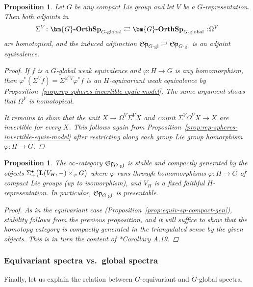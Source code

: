 \documentclass[reqno]{memo-l}
\theoremstyle{mythm}
\newtheorem{prop}[thm]{Proposition}
\theoremstyle{definition}
\numberwithin{equation}{section}
\renewcommand{\phi}{\varphi}
\newcommand{\cat}[1]{\textbf{\textup{#1}}}
\newcommand\noloc{%
	\nobreak
	\mspace{6mu plus 1mu}
	{:}
	\nonscript\mkern-\thinmuskip
	\mathpunct{}
	\mspace{2mu}
}
\newcommand{\mySp}{{\mathfrak S\kern-.5pt\mathfrak p}}
\newcommand{\Gosp}[1]{\cat{$\bm{#1}$-OrthSp}}
\begin{document}
\begin{prop}\label{prop:resp-stability-G-gl}
    Let $G$ be any compact Lie group and let $V$ be a $G$-representation. Then both adjoints in
    \[
        \Sigma^V\colon\Gosp{G}_\textup{$G$-global}\rightleftarrows\Gosp{G}_\textup{$G$-global}\noloc\Omega^V
    \]
    are homotopical, and the induced adjunction $\mySp_\textup{$G$-gl}\rightleftarrows\mySp_\textup{$G$-gl}$ is an adjoint equivalence.
    \begin{proof}
        If $f$ is a $G$-global weak equivalence and $\phi\colon H\to G$ is any homomorphism, then $\phi^*(\Sigma^Vf)=\Sigma^{\phi^*V}\phi^*f$ is an $H$-equivariant weak equivalence by Proposition~\ref{prop:rep-spheres-invertible-equiv-model}. The same argument shows that $\Omega^V$ is homotopical.

        It remains to show that the unit $X\to\Omega^V\Sigma^VX$ and counit $\Sigma^V\Omega^VX\to X$ are invertible for every $X$. This follows again from Proposition~\ref{prop:rep-spheres-invertible-equiv-model} after restricting along each group Lie group homorphism $\phi\colon H\to G$.
    \end{proof}
\end{prop}

\begin{prop}\label{prop:gl-spectra-compact-generators}
    The $\infty$-category $\mySp_\textup{$G$-gl}$ is stable and compactly generated by the objects $\Sigma^\bullet_+\big(\cat{L}(V_H,-)\times_\phi G\big)$ where $\phi$ runs through homomorphisms $\phi\colon H\to G$ of compact Lie groups (up to isomorphism), and $V_H$ is a fixed faithful $H$-representation. In particular, $\mySp_\textup{$G$-gl}$ is presentable.
    \begin{proof}
        As in the equivariant case (Proposition~\ref{prop:equiv-sp-compact-gen}), stability follows from the previous proposition, and it will suffice to show that the homotopy category is compactly generated in the triangulated sense by the given objects. This is in turn the content of \cite{schwede-stiefel}*{Corollary A.19}.
    \end{proof}
\end{prop}

\subsubsection{Equivariant spectra vs.~global spectra} Finally, let us explain the relation between $G$-equivariant and $G$-global spectra.
\end{document}
